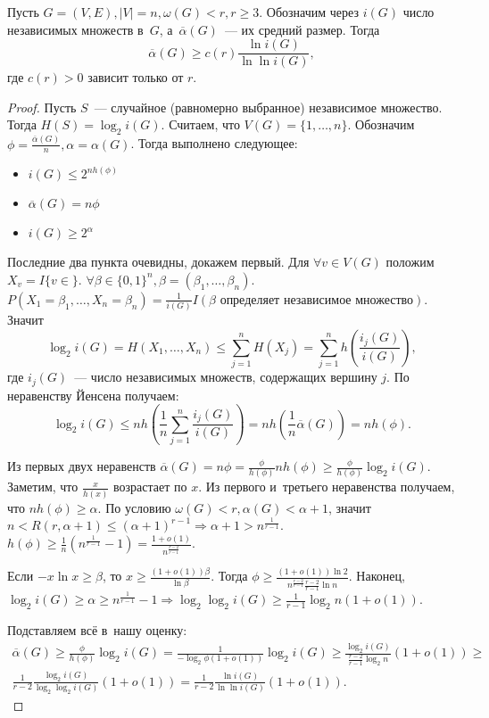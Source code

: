 \documentclass{article}
\begin{document}
\begin{lemma}
	Пусть $G = (V, E), |V| = n, \omega(G) < r, r \ge 3$. Обозначим через $i(G)$
	число независимых множеств в~$G$, а~$\overline\alpha(G)$~--- их средний
	размер. Тогда
	$$ \overline\alpha(G) \ge c(r) \frac{\ln i(G)}{\ln \ln i(G)}, $$
	где $c(r) > 0$ зависит только от $r$.
\end{lemma}
\begin{proof}
	Пусть $S$~--- случайное (равномерно выбранное) независимое множество. Тогда
	$H(S) = \log_2 i(G)$. Считаем, что $V(G) = \{1, \ldots, n\}$. Обозначим $\phi
	= \frac{\overline\alpha(G)}{n}, \alpha = \alpha(G)$. Тогда выполнено
	следующее:
	\begin{itemize}
		\item $i(G) \le 2^{nh(\phi)}$
		\item $\overline\alpha(G) = n\phi$
		\item $i(G) \ge 2^\alpha$
	\end{itemize}
	Последние два пункта очевидны, докажем первый. Для $\forall v \in V(G)$
	положим $X_v = I\{v \in \}$. $\forall \beta \in \{0, 1\}^n, \beta = (\beta_1,
	\ldots, \beta_n)$. $P(X_1 = \beta_1, \ldots, X_n = \beta_n) = \frac{1}{i(G)}
	I(\beta \text{ определяет независимое множество})$. Значит
	$$\log_2 i(G) = H(X_1, \ldots, X_n) \le \sum\limits_{j=1}^n H(X_j) =
	\sum\limits_{j=1}^n h\left(\frac{i_j(G)}{i(G)}\right),$$
	где $i_j(G)$~--- число независимых множеств, содержащих вершину $j$. По
	неравенству Йенсена получаем: $$\log_2 i(G) \le n h\left(\frac{1}{n}
	\sum\limits_{j=1}^n \frac{i_j(G)}{i(G)}\right) = n h\left(\frac{1}{n}
	\overline\alpha(G)\right) = nh(\phi).$$

	Из первых двух неравенств $\overline\alpha(G) = n\phi = \frac{\phi}{h(\phi)} n
	h(\phi) \ge \frac{\phi}{h(\phi)} \log_2 i(G)$. Заметим, что $\frac{x}{h(x)}$
	возрастает по $x$. Из первого и~третьего неравенства получаем, что
	$nh(\phi) \ge \alpha$. По условию $\omega(G) < r, \alpha(G) < \alpha + 1$,
	значит $n < R(r, \alpha + 1) \le (\alpha + 1)^{r-1} \Rightarrow \alpha + 1 >
	n^\frac{1}{r-1}$. $h(\phi) \ge \frac{1}{n} \left( n^\frac{1}{r-1} - 1\right) =
	\frac{1 + o(1)}{n^\frac{r-2}{r-1}}$.

	Если $-x \ln x \ge \beta$, то $x \ge \frac{(1 + o(1)) \beta}{\ln \beta}$.
	Тогда $\phi \ge \frac{(1 + o(1)) \ln 2}{n^\frac{r-2}{r-1} \frac{r-2}{r-1}
	\ln n}$. Наконец, $\log_2 i(G) \ge \alpha \ge n^\frac{1}{r-1} - 1 \Rightarrow
	\log_2 \log_2 i(G) \ge \frac{1}{r-1} \log_2 n (1 + o(1))$.

	Подставляем всё в~нашу оценку:
	\begin{multline*}
		\overline\alpha(G) \ge \frac{\phi}{h(\phi)} \log_2 i(G) =
		\frac{1}{-\log_2 \phi (1 + o(1))} \log_2 i(G) \ge \frac{\log_2
		i(G)}{\frac{r-2}{r-1} \log_2 n} (1 + o(1)) \ge\\
		\frac{1}{r-2} \frac{\log_2 i(G)}{\log_2 \log_2 i(G)} (1 + o(1)) =
		\frac{1}{r-2} \frac{\ln i(G)}{\ln \ln i(G)} (1 + o(1)).
	\end{multline*}
\end{proof}
\end{document}
